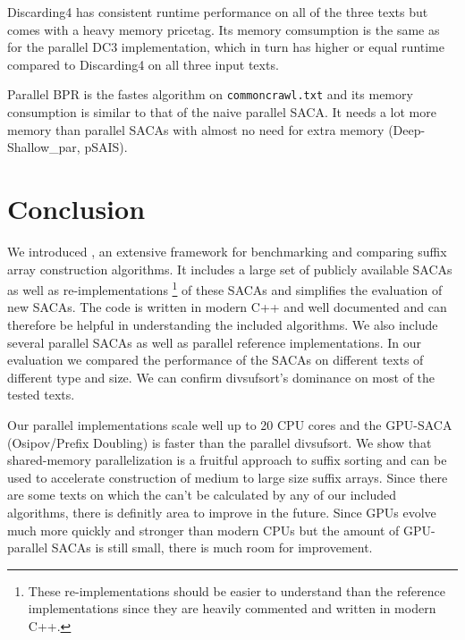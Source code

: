 Discarding4 has consistent runtime performance on all of the three texts but comes with a heavy memory pricetag.
Its memory comsumption is the same as for the parallel DC3 implementation, which in turn has higher or equal runtime compared to Discarding4 on all three input texts.

Parallel BPR is the fastes algorithm on \texttt{commoncrawl.txt} and its memory consumption is similar to that of the naive parallel SACA. It needs a lot more memory than parallel SACAs with almost no need for extra memory (Deep-Shallow\_par, pSAIS).


\section{Conclusion}

We introduced \sacabench, an extensive framework for benchmarking and comparing suffix array construction algorithms.
It includes a large set of publicly available SACAs as well as re-implementations%
\footnote{These re-implementations should be easier to understand than the reference implementations since they are heavily commented and written in modern C++.}
of these SACAs and simplifies the evaluation of new SACAs.
The code is written in modern C++ and well documented and can therefore be helpful in understanding the included algorithms.
We also include several parallel SACAs as well as parallel reference implementations.
In our evaluation we compared the performance of the SACAs on different texts of different type and size.
We can confirm divsufsort's dominance on most of the tested texts.

Our parallel implementations scale well up to 20 CPU cores and the GPU-SACA (Osipov/Prefix Doubling) is faster than the parallel divsufsort.
We show that shared-memory parallelization is a fruitful approach to suffix sorting
and can be used to accelerate construction of medium to large size suffix arrays.
Since there are some texts on which the \sa can't be calculated by any of our included algorithms,
there is definitly area to improve in the future.
Since GPUs evolve much more quickly and stronger than modern CPUs
but the amount of GPU-parallel SACAs is still small, there is much room for improvement.


